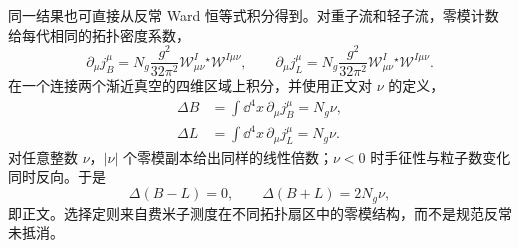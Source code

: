 \begin{derivation}
同一结果也可直接从反常 Ward 恒等式积分得到。对重子流和轻子流，零模计数给每代相同的拓扑密度系数，
\begin{equation*}
 \partial_\mu j_B^\mu
 =N_g\frac{g^2}{32\pi^2}
 \mathcal W_{\mu\nu}^I{}^\star\!\mathcal W^{I\mu\nu},
 \qquad
 \partial_\mu j_L^\mu
 =N_g\frac{g^2}{32\pi^2}
 \mathcal W_{\mu\nu}^I{}^\star\!\mathcal W^{I\mu\nu}.
\end{equation*}
在一个连接两个渐近真空的四维区域上积分，并使用正文对 $\nu$ 的定义，
\begin{align*}
 \Delta B
 &=\int\dd^4x\,\partial_\mu j_B^\mu
 =N_g\nu,\\
 \Delta L
 &=\int\dd^4x\,\partial_\mu j_L^\mu
 =N_g\nu.
\end{align*}
对任意整数 $\nu$，$|\nu|$ 个零模副本给出同样的线性倍数；$\nu<0$ 时手征性与粒子数变化同时反向。于是
\begin{equation*}
 \Delta(B-L)=0,
 \qquad
 \Delta(B+L)=2N_g\nu,
\end{equation*}
即正文。选择定则来自费米子测度在不同拓扑扇区中的零模结构，而不是规范反常未抵消。
\end{derivation}

